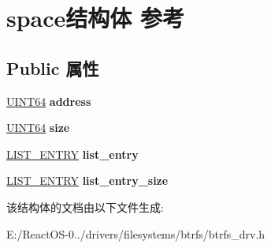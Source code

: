 \hypertarget{structspace}{}\section{space结构体 参考}
\label{structspace}
\subsection*{Public 属性}
\begin{DoxyCompactItemize}
\item 
\mbox{\label{structspace_ab3e33b9eb5bc46fe0a0676d977974cc1}} 
\hyperlink{_processor_bind_8h_a57be03562867144161c1bfee95ca8f7c}{U\+I\+N\+T64} {\bfseries address}
\item 
\mbox{\label{structspace_ae936ea2737f0a395e0d33fe74e9e3f0f}} 
\hyperlink{_processor_bind_8h_a57be03562867144161c1bfee95ca8f7c}{U\+I\+N\+T64} {\bfseries size}
\item 
\mbox{\label{structspace_a060b3c47bd62e5286cac950dd4147474}} 
\hyperlink{struct___l_i_s_t___e_n_t_r_y}{L\+I\+S\+T\+\_\+\+E\+N\+T\+RY} {\bfseries list\+\_\+entry}
\item 
\mbox{\label{structspace_a5a2a2b709eb2dfba38686e41800a3edd}} 
\hyperlink{struct___l_i_s_t___e_n_t_r_y}{L\+I\+S\+T\+\_\+\+E\+N\+T\+RY} {\bfseries list\+\_\+entry\+\_\+size}
\end{DoxyCompactItemize}


该结构体的文档由以下文件生成\+:\begin{DoxyCompactItemize}
\item 
E\+:/\+React\+O\+S-\/0../drivers/filesystems/btrfs/btrfs\+\_\+drv.\+h\end{DoxyCompactItemize}
